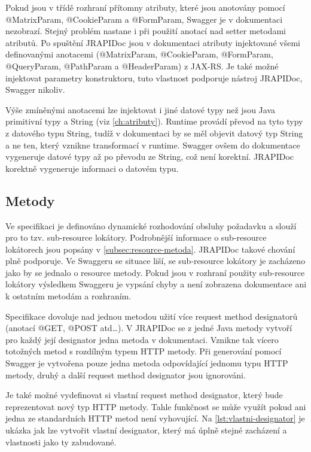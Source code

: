 \documentclass[11pt,twoside,a4paper]{book}
\begin{document}
Pokud jsou v třídě rozhraní přítomny atributy, které jsou anotovány pomocí 
@MatrixParam, @CookieParam a @FormParam, Swagger je v dokumentaci
nezobrazí. Stejný problém nastane i při použití anotací nad setter metodami
atributů. Po spuštění JRAPIDoc jsou v dokumentaci atributy injektované všemi
definovanými anotacemi (@MatrixParam, @CookieParam, @FormParam, @QueryParam,
@PathParam a @HeaderParam) z JAX-RS. Je také možné injektovat parametry
konstruktoru, tuto vlastnost podporuje nástroj JRAPIDoc, Swagger nikoliv.

Výše zmíněnými anotacemi lze injektovat i jiné datové typy než jsou Java
primitivní typy a String (viz \ref{ch:atributy}). Runtime provádí převod na tyto
typy z datového typu String, tudíž v dokumentaci by se měl objevit datový
typ String a ne ten, který vznikne transformací v runtime.
Swagger ovšem do dokumentace vygeneruje datové typy až po převodu ze String, což
není korektní. JRAPIDoc korektně vygeneruje informaci o datovém typu.

\subsection{Metody}

Ve specifikaci je definováno dynamické rozhodování obsluhy požadavku a slouží
pro to tzv. sub-resource lokátory. Podrobnější informace o sub-resource
lokátorech jsou popsány v \ref{subsec:resource-metoda}. JRAPIDoc takové chování
plně podporuje. Ve Swaggeru se situace liší, se sub-resource lokátory  je
zacházeno jako by se jednalo o resource metody. Pokud jsou v rozhraní
použity sub-resource lokátory výsledkem Swaggeru je vypsání chyby a není 
zobrazena dokumentace ani k ostatním metodám a rozhraním.

Specifikace dovoluje nad jednou metodou užití více request method designatorů
(anotací @GET, @POST atd\ldots). V JRAPIDoc se z jedné Java metody
vytvoří pro každý její designator jedna metoda v dokumentaci. Vznikne tak vícero
totožných metod s rozdílným typem HTTP metody. Při generování pomocí Swagger je
vytvořena pouze jedna metoda odpovídající jednomu typu HTTP metody, druhý a další 
request method designator jsou ignorováni.

Je také možné vydefinovat si vlastní request method designator, který bude
reprezentovat nový typ HTTP metody. Tahle funkčnost se může využít pokud ani
jedna ze standardních HTTP metod není vyhovující. Na \ref{lst:vlastni-designator} je ukázka jak
lze vytvořit vlastní designator, který má úplně stejné zacházení a vlastnosti
jako ty zabudované. 
\end{document}
